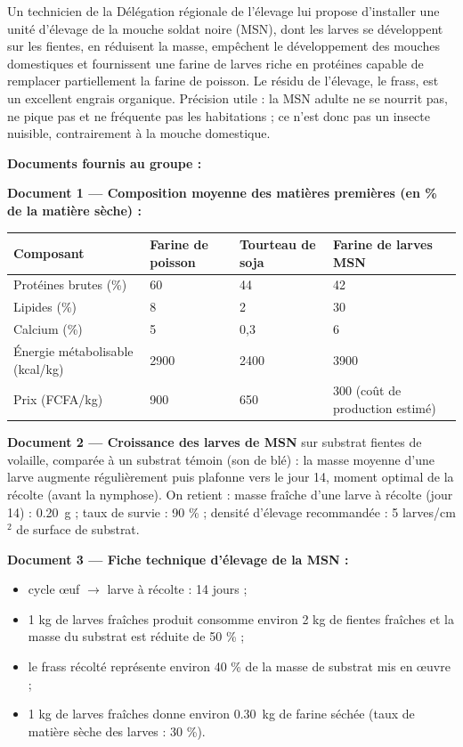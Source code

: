 \documentclass[11pt]{article}
\newcommand{\cle}[1]{{\popxbold\color{popdark}#1}}
\begin{document}
Un technicien de la Délégation régionale de l'élevage lui propose d'installer une unité d'élevage de la \cle{mouche soldat noire} (MSN), dont les larves se développent sur les fientes, en réduisent la masse, empêchent le développement des mouches domestiques et fournissent une \cle{farine de larves} riche en protéines capable de remplacer partiellement la farine de poisson. Le résidu de l'élevage, le \cle{frass}, est un excellent engrais organique. Précision utile : la MSN adulte ne se nourrit pas, ne pique pas et ne fréquente pas les habitations ; ce n'est donc pas un insecte nuisible, contrairement à la mouche domestique.

\textbf{Documents fournis au groupe :}

\textbf{Document 1 — Composition moyenne des matières premières (en \% de la matière sèche) :}

\begin{center}
\begin{tabularx}{\linewidth}{|l|X|X|X|}
\hline
\rowcolor{popblueL} \textbf{Composant} & \textbf{Farine de poisson} & \textbf{Tourteau de soja} & \textbf{Farine de larves MSN} \\
\hline
Protéines brutes (\%) & 60 & 44 & 42 \\
\hline
Lipides (\%) & 8 & 2 & 30 \\
\hline
Calcium (\%) & 5 & 0,3 & 6 \\
\hline
Énergie métabolisable (kcal/kg) & 2900 & 2400 & 3900 \\
\hline
Prix (FCFA/kg) & 900 & 650 & 300 (coût de production estimé) \\
\hline
\end{tabularx}
\end{center}

\textbf{Document 2 — Croissance des larves de MSN} sur substrat fientes de volaille, comparée à un substrat témoin (son de blé) : la masse moyenne d'une larve augmente régulièrement puis plafonne vers le jour 14, moment optimal de la récolte (avant la nymphose). On retient : masse fraîche d'une larve à récolte (jour 14) : \SI{0,20}{g} ; taux de survie : 90 \% ; densité d'élevage recommandée : 5 larves/cm$^2$ de surface de substrat.

\textbf{Document 3 — Fiche technique d'élevage de la MSN :}
\begin{itemize}
\item cycle œuf $\rightarrow$ larve à récolte : 14 jours ;
\item 1 kg de larves fraîches produit consomme environ 2 kg de fientes fraîches et la masse du substrat est réduite de 50 \% ;
\item le frass récolté représente environ 40 \% de la masse de substrat mis en œuvre ;
\item 1 kg de larves fraîches donne environ \SI{0,30}{kg} de farine séchée (taux de matière sèche des larves : 30 \%).
\end{itemize}
\end{document}
